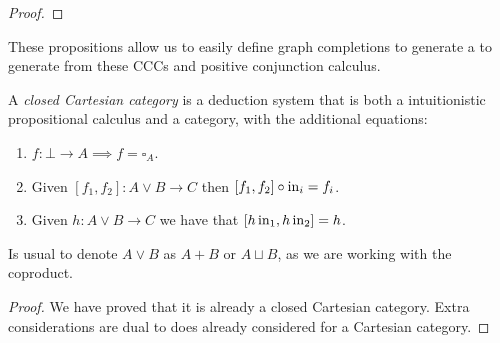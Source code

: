 \begin{proof}



  
\end{proof}

These propositions allow us to easily define graph completions to generate a to generate from these CCCs and positive conjunction calculus.

\begin{proposition} A \emph{closed Cartesian category} is a deduction system that is both a intuitionistic propositional calculus and a category, with the additional equations:
  \begin{enumerate}
  \item $f:\bot \to A \implies f=\square_A$.
  \item Given $[f_1,f_2] : A\lor B \to C$ then $ [f_1,f_2]\circ \operatorname{in}_i  = f_i$.
  \item Given $h:A\lor B\to C$ we have that $[ h\operatorname{in}_1, h\operatorname{in}_2] = h$.
  \end{enumerate}
\end{proposition}
\begin{remark}
  Is usual to denote $A\lor B$ as $A+B$ or $A\sqcup B$, as we are working with the coproduct.
\end{remark} 
\begin{proof}
  We have proved that it is already a closed Cartesian category. Extra considerations are dual to does already considered for a Cartesian category.
\end{proof}
